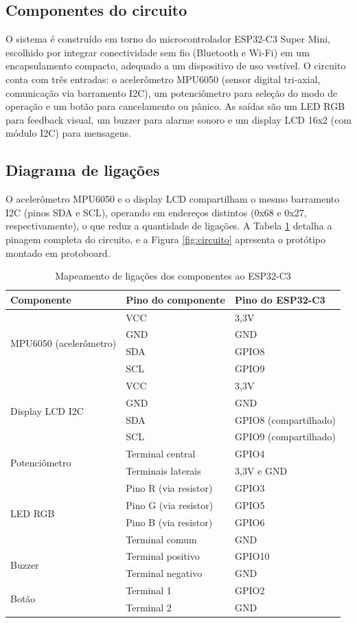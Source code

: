 \subsection{\esp Componentes do circuito}

O sistema é construído em torno do microcontrolador ESP32-C3 Super Mini, escolhido por integrar conectividade sem fio (Bluetooth e Wi-Fi) em um encapsulamento compacto, adequado a um dispositivo de uso vestível. O circuito conta com três entradas: o acelerômetro MPU6050 (sensor digital tri-axial, comunicação via barramento I2C), um potenciômetro para seleção do modo de operação e um botão para cancelamento ou pânico. As saídas são um LED RGB para feedback visual, um buzzer para alarme sonoro e um display LCD 16x2 (com módulo I2C) para mensagens.

\subsection{\esp Diagrama de ligações}

O acelerômetro MPU6050 e o display LCD compartilham o mesmo barramento I2C (pinos SDA e SCL), operando em endereços distintos (0x68 e 0x27, respectivamente), o que reduz a quantidade de ligações. A Tabela \ref{tab:pinagem} detalha a pinagem completa do circuito, e a Figura \ref{fig:circuito} apresenta o protótipo montado em protoboard.

\begin{table}[H]
\centering
\footnotesize
\caption{Mapeamento de ligações dos componentes ao ESP32-C3}
\label{tab:pinagem}
\begin{tabular}{|l|l|l|}
\hline
\textbf{Componente} & \textbf{Pino do componente} & \textbf{Pino do ESP32-C3} \\
\hline
\multirow{4}{*}{MPU6050 (acelerômetro)} & VCC & 3,3V \\
 & GND & GND \\
 & SDA & GPIO8 \\
 & SCL & GPIO9 \\
\hline
\multirow{4}{*}{Display LCD I2C} & VCC & 3,3V \\
 & GND & GND \\
 & SDA & GPIO8 (compartilhado) \\
 & SCL & GPIO9 (compartilhado) \\
\hline
\multirow{2}{*}{Potenciômetro} & Terminal central & GPIO4 \\
 & Terminais laterais & 3,3V e GND \\
\hline
\multirow{4}{*}{LED RGB} & Pino R (via resistor) & GPIO3 \\
 & Pino G (via resistor) & GPIO5 \\
 & Pino B (via resistor) & GPIO6 \\
 & Terminal comum & GND \\
\hline
\multirow{2}{*}{Buzzer} & Terminal positivo & GPIO10 \\
 & Terminal negativo & GND \\
\hline
\multirow{2}{*}{Botão} & Terminal 1 & GPIO2 \\
 & Terminal 2 & GND \\
\hline
\end{tabular}
\end{table}

